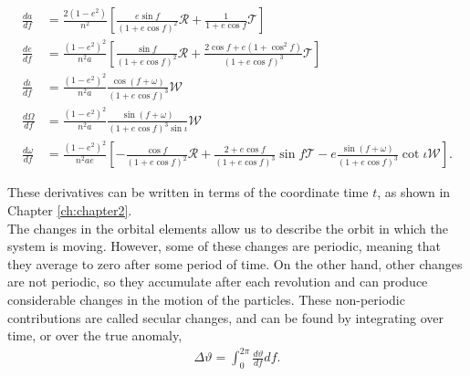\begin{subequations}\label{eq:OsculatingOrbitalElementsinf}
\begin{align}
\frac{da}{df} &= \frac{2(1-e^2)}{n^2} \left[ \frac{e \sin f }{(1+e \cos f)^2}\mathcal{R} + \frac{1}{1+e\cos f} \mathcal{T} \right] \\
\frac{de}{df} &= \frac{(1-e^2)^2}{n^2a} \left[ \frac{\sin f}{(1+e \cos f)^2} \mathcal{R} + \frac{2\cos f + e \left( 1 + \cos^2 f \right) }{(1 + e\cos f)^3} \mathcal{T} \right] \\
\frac{d \iota}{df} &= \frac{(1-e^2)^2}{n^2 a} \frac{\cos (f+\omega)}{(1+e\cos f)^3} \mathcal{W} \\
\frac{d \Omega}{df} &= \frac{(1-e^2)^2}{n^2 a}  \frac{\sin (f+\omega)}{(1+e\cos f)^3 \sin \iota } \mathcal{W} \\
\frac{d\omega}{df} &=\frac{(1-e^2)^2}{n^2 a e}  \left[ - \frac{\cos f}{(1+e\cos f)^2} \mathcal{R} + \frac{2+e\cos f}{(1 + e \cos f)^3} \sin f \mathcal{T} - e  \frac{\sin (f + \omega)}{(1 + e \cos f)^3} \cot \iota \mathcal{W} \right].
\end{align}
\end{subequations}

These derivatives can be written in terms of the coordinate time $t$, as shown in Chapter \ref{ch:chapter2}.\\

The changes in the orbital elements allow us to describe the orbit in which the system is moving. However, some of these changes are periodic, meaning that they average to zero after some period of time. On the other hand, other changes are not periodic, so they accumulate after each revolution and can produce considerable changes in the motion of the particles. These non-periodic contributions are called secular changes, and can be found by integrating over time, or over the true anomaly,
\begin{align}\label{eq: secularchanges}
\Delta \vartheta = \int_0^{2\pi} \frac{d \vartheta}{df}df.
\end{align}







